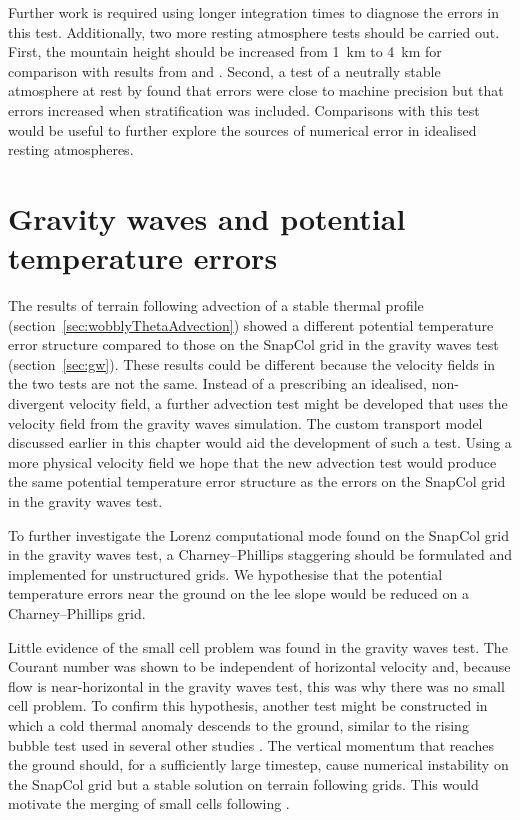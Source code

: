 Further work is required using longer integration times to diagnose the errors in this test.  Additionally, two more resting atmosphere tests should be carried out.  First, the mountain height should be increased from \SI{1}{\kilo\meter} to \SI{4}{\kilo\meter} for comparison with results from \textcite{zaengl2012} and \textcite{good2013}.  Second, a test of a neutrally stable atmosphere at rest by \textcite{botta2004} found that errors were close to machine precision but that errors increased when stratification was included.  Comparisons with this test would be useful to further explore the sources of numerical error in idealised resting atmospheres.

\section{Gravity waves and potential temperature errors}
\label{sec:further-work:gw}

The results of terrain following advection of a stable thermal profile (section~\ref{sec:wobblyThetaAdvection}) showed a different potential temperature error structure compared to those on the SnapCol grid in the gravity waves test (section~\ref{sec:gw}).  These results could be different because the velocity fields in the two tests are not the same.  Instead of a prescribing an idealised, non-divergent velocity field, a further advection test might be developed that uses the velocity field from the gravity waves simulation.  The custom transport model discussed earlier in this chapter would aid the development of such a test.  Using a more physical velocity field we hope that the new advection test would produce the same potential temperature error structure as the errors on the SnapCol grid in the gravity waves test.

To further investigate the Lorenz computational mode found on the SnapCol grid in the gravity waves test, a Charney--Phillips staggering should be formulated and implemented for unstructured grids.  We hypothesise that the potential temperature errors near the ground on the lee slope would be reduced on a Charney--Phillips grid.

Little evidence of the small cell problem was found in the gravity waves test.  The Courant number was shown to be independent of horizontal velocity and, because flow is near-horizontal in the gravity waves test, this was why there was no small cell problem.  To confirm this hypothesis, another test might be constructed in which a cold thermal anomaly descends to the ground, similar to the rising bubble test used in several other studies \parencites{bonaventura2000}{jebens2011}{good2013}.  The vertical momentum that reaches the ground should, for a sufficiently large timestep, cause numerical instability on the SnapCol grid but a stable solution on terrain following grids.  This would motivate the merging of small cells following \textcite{yamazaki-satomura2010}.

